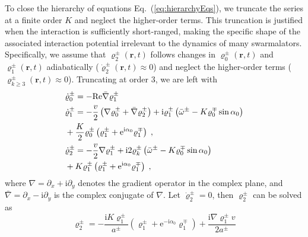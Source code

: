 \documentclass{article}
\begin{document}
To close the hierarchy of equations Eq.~(\ref{eq:hierarchyEqs}), we truncate the series at a finite order $K$ and neglect the higher-order terms. This truncation is justified when the interaction is sufficiently short-ranged, making the specific shape of the associated interaction potential irrelevant to the dynamics of many swarmalators. Specifically, we assume that $\varrho_2^{\pm}\left(\mathbf{r},t\right)$ follows changes in $\varrho_0^{\pm}\left(\mathbf{r},t\right)$ and $\varrho_1^{\pm}\left(\mathbf{r},t\right)$ adiabatically ($\dot{\varrho}_2^{\pm}\left( \mathbf{r},t \right) \approx 0$) and neglect the higher-order terms ($\varrho _{k\geqslant 3}^{\pm}\left( \mathbf{r},t \right) \approx 0$).
Truncating at order 3, we are left with
\begin{subequations}
    \begin{align}
        &\dot{\varrho}_{0}^{\pm}=-\mathrm{Re}\bar{\nabla}\varrho _{1}^{\pm}\\
        &\dot{\varrho}_{1}^{\pm}=-\frac{v}{2}\left( \nabla \varrho _{0}^{\pm}+\bar{\nabla}\varrho _{2}^{\pm} \right)+\mathrm{i}\varrho _{1}^{\pm}\left( \bar{\omega}^{\pm}-K\varrho _{0}^{\mp}\sin \alpha _0 \right)\notag\\
        &+\frac{K}{2}\varrho _{0}^{\pm}\left( \varrho _{1}^{\pm}+\mathrm{e}^{\mathrm{i}\alpha _0}\varrho _{1}^{\mp} \right) \;,\label{eq:secondOrder}\\
        &\dot{\varrho}_{2}^{\pm}=-\frac{v}{2}\nabla \varrho _{1}^{\pm}+\mathrm{i}2\varrho _{k}^{\pm}\left( \bar{\omega}^{\pm}-K\varrho _{0}^{\mp}\sin \alpha _0 \right)\notag\\
	    &+K\varrho _{1}^{\pm}\left( \varrho _{1}^{\pm}+\mathrm{e}^{\mathrm{i}\alpha _0}\varrho _{1}^{\mp} \right)\;,\label{eq:thirdOrder}
    \end{align}
\end{subequations}
where $\nabla =\partial _x+\mathrm{i}\partial _y$ denotes the gradient operator in the complex plane, and $\bar{\nabla}=\partial _x-\mathrm{i}\partial _y$ is the complex conjugate of $\nabla$. Let $\dot{\varrho}_2^{\pm}=0$, then $\varrho_2^{\pm}$ can be solved as
\begin{equation}
    \varrho _{2}^{\pm}=-\frac{\mathrm{i}K\varrho _{1}^{\pm}}{a^{\pm}}\left( \varrho _{1}^{\pm}+\mathrm{e}^{-\mathrm{i}\alpha _0}\varrho _{1}^{\mp} \right) +\frac{\mathrm{i}\nabla \varrho _{1}^{\pm}v}{2a^{\pm}}
\end{equation}
\end{document}
